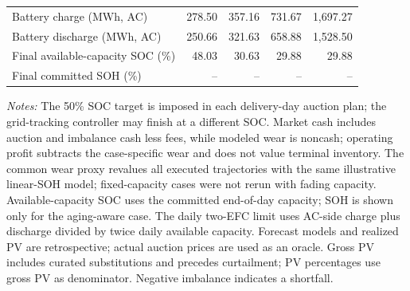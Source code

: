 \begin{table}[htbp]
{\begin{tabular}{lrrrr}
Battery charge (MWh, AC) & 278.50 & 357.16 & 731.67 & 1,697.27 \\
Battery discharge (MWh, AC) & 250.66 & 321.63 & 658.88 & 1,528.50 \\
Final available-capacity SOC (\%) & 48.03 & 30.63 & 29.88 & 29.88 \\
Final committed SOH (\%) & -- & -- & -- & -- \\
\hline
\end{tabular}%
}
\par\smallskip
\parbox{0.98\textwidth}{\footnotesize\textit{Notes:} The 50\% SOC target is imposed in each delivery-day auction plan; the grid-tracking controller may finish at a different SOC. Market cash includes auction and imbalance cash less fees, while modeled wear is noncash; operating profit subtracts the case-specific wear and does not value terminal inventory. The common wear proxy revalues all executed trajectories with the same illustrative linear-SOH model; fixed-capacity cases were not rerun with fading capacity. Available-capacity SOC uses the committed end-of-day capacity; SOH is shown only for the aging-aware case. The daily two-EFC limit uses AC-side charge plus discharge divided by twice daily available capacity. Forecast models and realized PV are retrospective; actual auction prices are used as an oracle. Gross PV includes curated substitutions and precedes curtailment; PV percentages use gross PV as denominator. Negative imbalance indicates a shortfall.}
\end{table}

